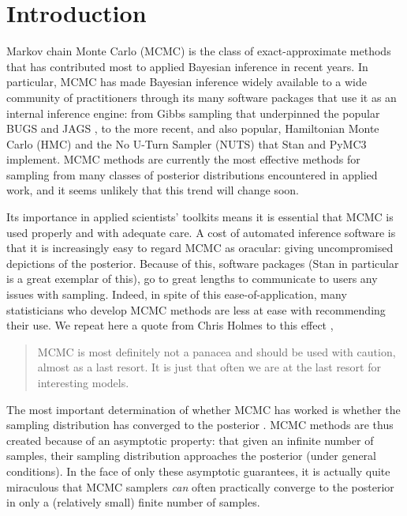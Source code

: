\documentclass{article}
\begin{document}
\section{Introduction}
Markov chain Monte Carlo (MCMC) is the class of exact-approximate methods that has contributed most to applied Bayesian inference in recent years. In particular, MCMC has made Bayesian inference widely available to a wide community of practitioners through its many software packages that use it as an internal inference engine: from Gibbs sampling \cite{geman1984stochastic} that underpinned the popular BUGS \cite{lunn2000winbugs} and JAGS \cite{plummer2003jags}, to the more recent, and also popular, Hamiltonian Monte Carlo (HMC) \cite{neal2011mcmc} and the No U-Turn Sampler (NUTS) \cite{hoffman2014no} that Stan \cite{carpenter2017stan} and PyMC3 \cite{salvatier2016probabilistic} implement. MCMC methods are currently the most effective methods for sampling from many classes of posterior distributions encountered in applied work, and it seems unlikely that this trend will change soon.

Its importance in applied scientists' toolkits means it is essential that MCMC is used properly and with adequate care. A cost of automated inference software is that it is increasingly easy to regard MCMC as oracular: giving uncompromised depictions of the posterior. Because of this, software packages (Stan in particular \cite{carpenter2017stan} is a great exemplar of this), go to great lengths to communicate to users any issues with sampling. Indeed, in spite of this ease-of-application, many statisticians who develop MCMC methods are less at ease with recommending their use. We repeat here a quote from Chris Holmes to this effect \cite{holmes},

\begin{quote}
	MCMC is most definitely not a panacea and should be used with caution, almost as a last resort. It is just that often we are at the last resort for interesting models.
\end{quote}

The most important determination of whether MCMC has worked is whether the sampling distribution has converged to the posterior \cite{lambert2018Student}. MCMC methods are thus created because of an asymptotic property: that given an infinite number of samples, their sampling distribution approaches the posterior (under general conditions). In the face of only these asymptotic guarantees, it is actually quite miraculous that MCMC samplers \textit{can} often practically converge to the posterior in only a (relatively small) finite number of samples.
\end{document}
